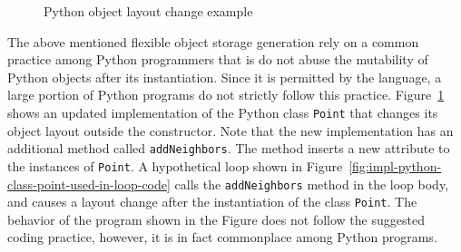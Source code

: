 \begin{figure}
\centering
{}
\caption{Python object layout change example}
\label{fig:impl-python-object-layout-change-example-code}
\end{figure}

The above mentioned flexible object storage generation rely on a common practice among Python programmers that is do not abuse the mutability of Python objects after its instantiation.
Since it is permitted by the language, a large portion of Python programs do not strictly follow this practice.
Figure~\ref{fig:impl-python-object-layout-change-example-code} shows an updated implementation of the Python class \texttt{Point} that changes its object layout outside the constructor.
Note that the new implementation has an additional method called \texttt{addNeighbors}.
The method inserts a new attribute to the instances of \texttt{Point}.
A hypothetical loop shown in Figure~\ref{fig:impl-python-class-point-used-in-loop-code} calls the \texttt{addNeighbors} method in the loop body, and causes a layout change after the instantiation of the class \texttt{Point}.
The behavior of the program shown in the Figure does not follow the suggested coding practice, however, it is in fact commonplace among Python programs.

